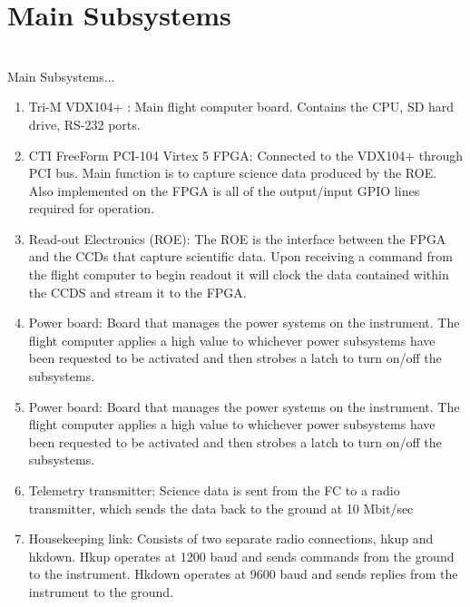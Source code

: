 %
\section{Main Subsystems}
\hrulefill
\\
Main Subsystems...
	\begin{enumerate}
		\item Tri-M VDX104+ : Main flight computer board. Contains the CPU, SD hard drive, RS-232 ports.
		\item CTI FreeForm PCI-104 Virtex 5 FPGA: Connected to the VDX104+ through PCI bus. Main function is to capture science data produced by the ROE. Also implemented on the FPGA is all of the output/input GPIO lines required for operation.
		\item Read-out Electronics (ROE):  The ROE is the interface between the FPGA and the CCDs that capture scientific data. Upon receiving a command from the flight computer to begin readout it will clock the data contained within the CCDS and stream it to the FPGA.
		\item Power board: Board that manages the power systems on the instrument. The flight computer applies a high value to whichever power subsystems have been requested to be activated and then strobes a latch to turn on/off the subsystems.
		\item Power board: Board that manages the power systems on the instrument. The flight computer applies a high value to whichever power subsystems have been requested to be activated and then strobes a latch to turn on/off the subsystems.
		\item Telemetry transmitter: Science data is sent from the FC to a radio transmitter, which sends the data back to the ground at 10 Mbit/sec
		\item Housekeeping link: Consists of two separate radio connections, hkup and hkdown. Hkup operates at 1200 baud and sends commands from the ground to the instrument. Hkdown operates at 9600 baud and sends replies from the instrument to the ground.
	\end{enumerate}
